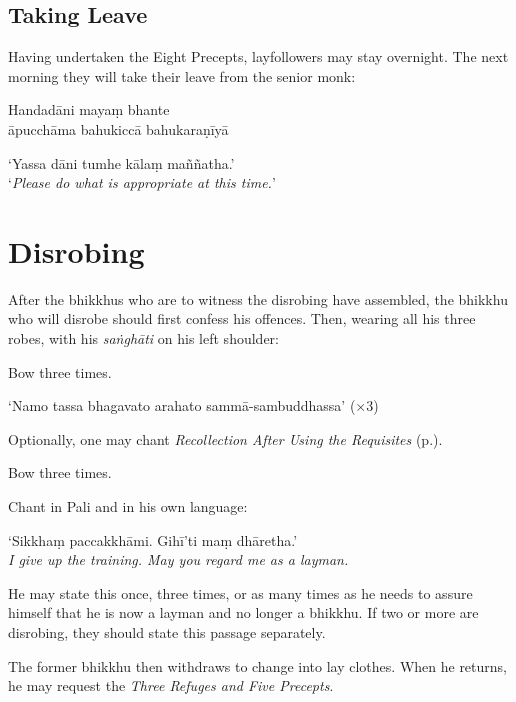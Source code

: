 \subsection{Taking Leave}

Having undertaken the Eight Precepts, layfollowers may stay overnight. The next
morning they will take their leave from the senior monk:


Handadāni mayaṃ bhante\\
āpucchāma bahukiccā bahukaraṇīyā


‘Yassa dāni tumhe kālaṃ maññatha.’\\
‘\emph{Please do what is appropriate at this time.}’

\ifhandbookedition
\clearpage
\fi

\section{Disrobing}

After the bhikkhus who are to witness the disrobing have assembled, the bhikkhu
who will disrobe should first confess his offences. Then, wearing all his three
robes, with his \emph{saṅghāti} on his left shoulder:

Bow three times.

‘Namo tassa bhagavato arahato sammā-sambuddhassa’ (×3)

Optionally, one may chant \emph{Recollection After Using the Requisites}
(p.\pageref{recollection-after-using}).

Bow three times.

Chant in Pali and in his own language:

‘Sikkhaṃ paccakkhāmi. Gihī'ti maṃ dhāretha.’\\
\emph{I give up the training. May you regard me as a layman.}

He may state this once, three times, or as many times as he needs to assure
himself that he is now a layman and no longer a bhikkhu. If two or more are
disrobing, they should state this passage separately.

The former bhikkhu then withdraws to change into lay clothes. When he returns,
he may request the \emph{Three Refuges and Five Precepts}.

